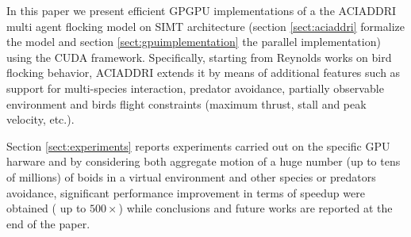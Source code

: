 In this paper we present efficient GPGPU implementations of a the
\textsc{ACIADDRI} multi agent flocking model on SIMT architecture (section \ref{sect:aciaddri}
formalize the model and section \ref{sect:gpuimplementation} the parallel
implementation) using the CUDA framework.
Specifically, starting from Reynolds works on bird flocking behavior, \textsc{ACIADDRI} extends it by means of
additional features such as support for multi-species interaction, predator
avoidance, partially observable environment and birds flight constraints
(maximum thrust, stall and peak velocity, etc.).

Section \ref{sect:experiments} reports experiments carried out on the
specific GPU harware and by considering both aggregate motion of a huge number (up to tens of millions) of boids in a virtual
environment and other species or predators avoidance, significant performance
improvement in terms of speedup were obtained ( up to $ 500\times$) while
conclusions and future works are reported at the end of the paper.

